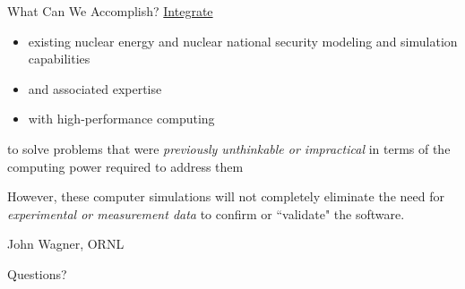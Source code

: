 \documentclass[xcolor=x11names,compress]{beamer}
\renewcommand{\(}{\begin{columns}}
\renewcommand{\)}{\end{columns}}
\newcommand{\<}[1]{\begin{column}{#1}}
\renewcommand{\>}{\end{column}}
\begin{document}
\begin{frame}{What Can We Accomplish?}
\underline{Integrate}
\begin{itemize}
\item existing nuclear energy and nuclear national security modeling and simulation capabilities
\item and associated expertise
\item with high-performance computing
\end{itemize}    
to solve problems that were \emph{previously unthinkable or impractical} in terms of the computing power required to address them

\vspace*{1em}
However, these computer simulations will not completely eliminate the need for \emph{experimental or measurement data} to confirm or ``validate" the software. 

\vspace*{1em}
\hspace*{0.25 in} John Wagner, ORNL
\end{frame}

%
%

\begin{frame}{Questions?}
\begin{figure}
\end{figure}
\end{frame}
\end{document}

